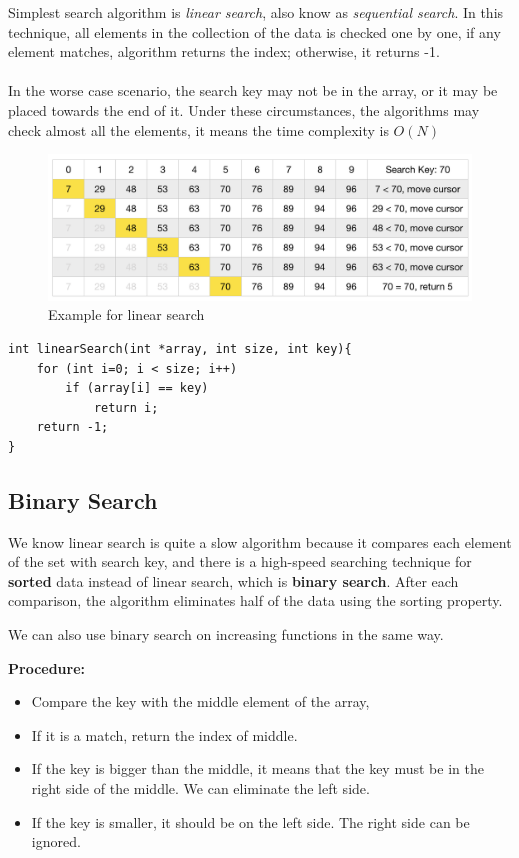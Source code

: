 \documentclass[12pt]{article}
\begin{document}
Simplest search algorithm is \textit{linear search}, also know as \textit{sequential search}. In this technique, all elements in the collection of the data is checked one by one, if any element matches, algorithm returns the index; otherwise, it returns -1. \\ \\
In the worse case scenario, the search key may not be in the array, or it may be placed towards the end of it. Under these circumstances, the algorithms may check almost all the elements, it means the time complexity is $O(N)$

\begin{figure}[h]
	\centering
	\includegraphics[width=0.9\linewidth]{linear_search}
	\caption{Example for linear search}
	\label{fig:linear_search}
\end{figure}


\begin{verbatim}
int linearSearch(int *array, int size, int key){
    for (int i=0; i < size; i++)
        if (array[i] == key)
            return i;
    return -1;
}
\end{verbatim}

\cleardoublepage
	
		\subsection{Binary Search}
			
We know linear search is quite a slow algorithm because it compares each element of the set with search key, and there is a high-speed searching technique for \textbf{sorted} data instead of linear search, which is \textbf{binary search}. After each comparison, the algorithm eliminates half of the data using the sorting property. 

We can also use binary search on increasing functions in the same way. 

\textbf{Procedure: }
\begin{itemize}
	\item Compare the key with the middle element of the array,
	\item If it is a match, return the index of middle.
	\item If the key is bigger than the middle, it means that the key must be in the right side of the middle. We can eliminate the left side.
	\item If the key is smaller, it should be on the left side. The right side can be ignored.
\end{itemize}	
\end{document}

